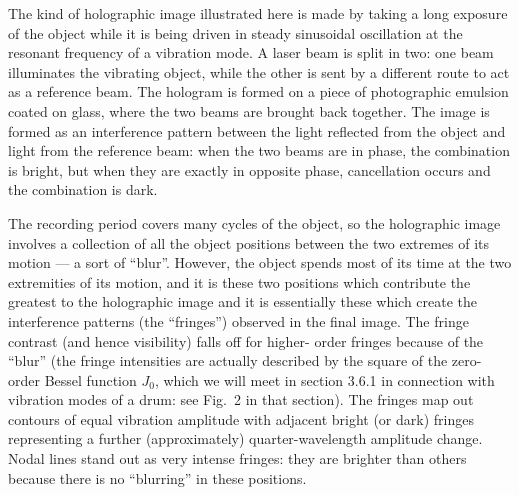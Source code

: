   The kind of holographic image illustrated here is made by taking a long 
  exposure of the object while it is being driven in steady sinusoidal 
  oscillation at the resonant frequency of a vibration mode. A laser beam is 
  split in two: one beam illuminates the vibrating object, while the other is 
  sent by a different route to act as a reference beam. The hologram is formed 
  on a piece of photographic emulsion coated on glass, where the two beams are 
  brought back together. The image is formed as an interference pattern between 
  the light reflected from the object and light from the reference beam: when 
  the two beams are in phase, the combination is bright, but when they are 
  exactly in opposite phase, cancellation occurs and the combination is dark. 


  The recording period covers many cycles of the object, so the holographic 
  image involves a collection of all the object positions between the two 
  extremes of its motion --- a sort of “blur”. However, the object spends most 
  of its time at the two extremities of its motion, and it is these two 
  positions which contribute the greatest to the holographic image and it is 
  essentially these which create the interference patterns (the “fringes”) 
  observed in the final image. The fringe contrast (and hence visibility) falls 
  off for higher- order fringes because of the “blur” (the fringe intensities 
  are actually described by the square of the zero-order Bessel function $J_0$, 
  which we will meet in section 3.6.1 in connection with vibration modes of a 
  drum: see Fig.\ 2 in that section). The fringes map out contours of equal 
  vibration amplitude with adjacent bright (or dark) fringes representing a 
  further (approximately) quarter-wavelength amplitude change. Nodal lines 
  stand out as very intense fringes: they are brighter than others because 
  there is no “blurring” in these positions. 